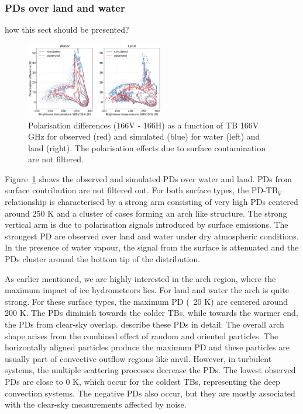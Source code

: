 \documentclass[amt, manuscript]{copernicus}
\newcommand{\todo}[1]{{\color{red} #1}}
\begin{document}
\subsubsection{PDs over land and water}
%
\todo{how this sect should be presented?}
\label{sec:PD}
\begin{figure}[t]
	\includegraphics[width=6cm]{Figures/hist2d_land_water_jan.pdf}
	\caption{Polarisation differences (166V - 166H) as a function of
		TB 166V GHz for observed (red) and simulated (blue) for
		water (left) and land (right). The polarisation effects due to surface contamination are not filtered. }
	\label{fig:PD_water_land}
\end{figure}

Figure~\ref{fig:PD_water_land} shows the observed and simulated PDs over water and land. PDs from surface contribution are not filtered out. For both surface types, the PD-TB$_V$ relationship is characterised by a strong arm consisting of very high PDs centered around 250\,\,K and a cluster of cases forming an arch like structure. The strong vertical arm is due to polarisation signals introduced by surface emissions. The strongest PD are observed over land and water under dry atmospheric conditions. In the presence of water vapour, the signal from the surface is attenuated and the PDs cluster around the bottom tip of the distribution. 

As earlier mentioned, we are highly interested in the arch region, where the maximum impact of ice hydrometeors lies. For land and water the arch is quite strong. For these surface types, the maximum PD (~20\,\,K) are centered around 200\,\,K. The PDs diminish towards the colder TBs, while towards the warmer end, the PDs from clear-sky overlap. \citet{gong:micro:17, galligani:param:21} describe these PDs in detail. The overall arch shape arises from the combined effect of random and oriented particles. The horizontally aligned particles produce the maximum PD and these particles are usually part of convective outflow regions like anvil. However, in turbulent systems, the multiple scattering processes decrease the PDs. The lowest observed PDs are close to 0\,\,K, which occur for the coldest TBs, representing the deep convection systems. The negative PDs also occur, but they are mostly associated with the clear-sky measurements affected by noise. 
\end{document}
